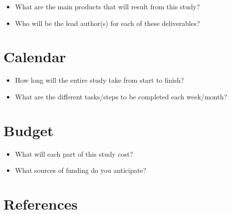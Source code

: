 \documentclass[
  letterpaper,
  DIV=11,
  numbers=noendperiod]{scrartcl}
\providecommand{\tightlist}{%
  \setlength{\itemsep}{0pt}\setlength{\parskip}{0pt}}\usepackage{longtable,booktabs,array}
\newlength{\cslhangindent}
\newenvironment{CSLReferences}[2] %
 {\begin{list}{}{%
  \setlength{\itemindent}{0pt}
  \setlength{\leftmargin}{0pt}
  \setlength{\parsep}{0pt}
  \ifodd #1
   \setlength{\leftmargin}{\cslhangindent}
   \setlength{\itemindent}{-1\cslhangindent}
  \fi
  \setlength{\itemsep}{#2\baselineskip}}}
 {\end{list}}
\begin{document}
\begin{itemize}
\tightlist
\item
  What are the main products that will result from this study?
\item
  Who will be the lead author(s) for each of these deliverables?
\end{itemize}

\section{Calendar}\label{calendar}

\begin{itemize}
\tightlist
\item
  How long will the entire study take from start to finish?
\item
  What are the different tasks/steps to be completed each week/month?
\end{itemize}

\section{Budget}\label{budget}

\begin{itemize}
\tightlist
\item
  What will each part of this study cost?
\item
  What sources of funding do you anticipate?
\end{itemize}

\section{References}\label{references}

\label{refs}
\begin{CSLReferences}{0}{1}
\end{CSLReferences}
\end{document}
